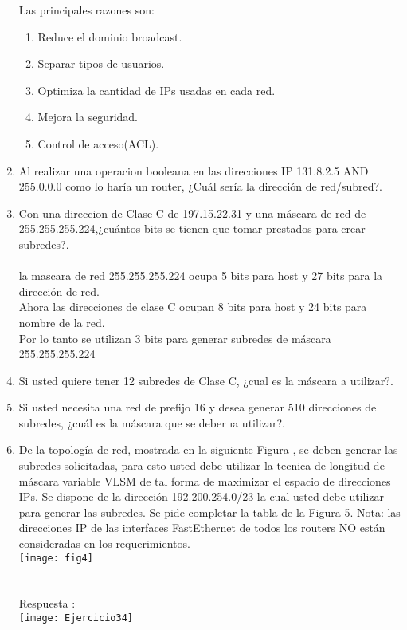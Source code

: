 \documentclass{udparticle}
\begin{document}
\begin{enumerate}
Las principales razones son:
\begin{enumerate}
\item Reduce el dominio broadcast.
\item Separar tipos de usuarios.
\item Optimiza la cantidad de IPs usadas en cada red.
\item Mejora la seguridad.
\item Control de acceso(ACL).
\end{enumerate}
\item Al realizar una operacion booleana en las direcciones IP 
131.8.2.5 AND 255.0.0.0 como lo haría un router, ¿Cuál sería la 
dirección de red/subred?.
\item Con una direccion de Clase C de 197.15.22.31 y una máscara de red
de 255.255.255.224,¿cuántos bits se tienen que tomar prestados para 
crear subredes?.\\\\
la mascara de red 255.255.255.224 ocupa 5 bits para host y 27 bits para la dirección de  red.\\
Ahora las direcciones de clase C ocupan 8 bits para host y 24 bits para nombre de la red.\\
Por lo tanto se utilizan 3 bits para generar subredes de máscara 255.255.255.224
\item Si usted quiere tener 12 subredes de Clase C, ¿cual es 
la máscara a utilizar?.
\item Si usted necesita una red de prefijo 16 y desea generar 
510 direcciones de subredes, ¿cuál es la máscara que se deber 
ıa utilizar?.
\item De la topología de red, mostrada en la siguiente Figura , se deben generar
las subredes solicitadas, para esto usted debe utilizar la tecnica de 
longitud de máscara variable VLSM de tal forma de maximizar el 
espacio de direcciones IPs. Se dispone de la dirección 
192.200.254.0/23 la cual usted debe utilizar para generar las 
subredes. Se pide completar la tabla de la Figura 5. Nota: las 
direcciones IP de las interfaces FastEthernet de todos los routers NO están consideradas en los requerimientos.\\
\texttt{[image: fig4]}
\\\\\\
Respuesta :\\
\texttt{[image: Ejercicio34]}


\end{enumerate}
\end{document}
